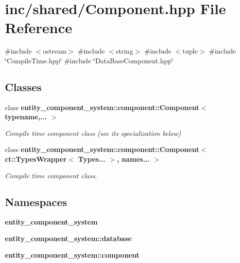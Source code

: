 \section{inc/shared/\+Component.hpp File Reference}
\label{_component_8hpp}
{\ttfamily \#include $<$ostream$>$}\newline
{\ttfamily \#include $<$string$>$}\newline
{\ttfamily \#include $<$tuple$>$}\newline
{\ttfamily \#include \char`\"{}Compile\+Time.\+hpp\char`\"{}}\newline
{\ttfamily \#include \char`\"{}Data\+Base\+Component.\+hpp\char`\"{}}\newline
\subsection*{Classes}
\begin{DoxyCompactItemize}
\item 
class {\bf entity\+\_\+component\+\_\+system\+::component\+::\+Component$<$ typename,... $>$}
\begin{DoxyCompactList}\small\item\em Compile time component class (see its specialization below) \end{DoxyCompactList}\item 
class {\bf entity\+\_\+component\+\_\+system\+::component\+::\+Component$<$ ct\+::\+Types\+Wrapper$<$ Types... $>$, names... $>$}
\begin{DoxyCompactList}\small\item\em Compile time component class. \end{DoxyCompactList}\end{DoxyCompactItemize}
\subsection*{Namespaces}
\begin{DoxyCompactItemize}
\item 
 {\bf entity\+\_\+component\+\_\+system}
\item 
 {\bf entity\+\_\+component\+\_\+system\+::database}
\item 
 {\bf entity\+\_\+component\+\_\+system\+::component}
\end{DoxyCompactItemize}
